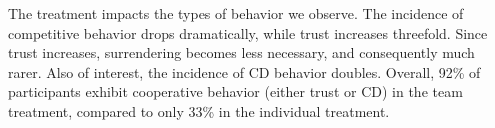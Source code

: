 The treatment impacts the types of behavior we observe.
The incidence of competitive behavior drops dramatically, while trust
increases threefold.  Since trust increases, surrendering becomes less
necessary, and consequently much rarer.  Also of interest, the
incidence of CD behavior doubles.  
Overall, 92\% of participants exhibit cooperative behavior (either
trust or CD) in the team treatment, compared to only 33\% in the
individual treatment.



